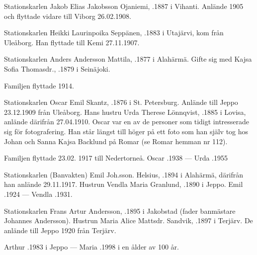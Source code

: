 {Stationskarlen Jakob Elias Jakobsson Ojaniemi, .1887 i Vihanti. Anlände 1905 och flyttade vidare till Viborg 26.02.1908.


Stationskarlen Heikki Laurinpoika Seppänen, .1883 i Utajärvi, kom från Uleåborg. Han flyttade till Kemi 27.11.1907.


Stationskarlen Anders Andersson Mattila, .1877 i Alahärmä. Gifte sig med Kajsa Sofia Thomasdr., .1879 i Seinäjoki.
\begin{jhchildren}
  \item {}
  \item {}
\end{jhchildren}
Familjen flyttade 1914.


Stationskarlen Oscar Emil Skantz, .1876 i St. Petersburg. Anlände till Jeppo 23.12.1909 från Uleåborg. Hans hustru Urda Therese Lönnqvist, .1885 i Lovisa, anlände därifrån 27.04.1910. Oscar var en av de personer som tidigt intresserade sig för fotografering. Han står längst till höger på ett foto som han själv tog hos Johan och Sanna Kajsa Backlund på Romar (se Romar hemman nr 112).
\begin{jhchildren}
  \item {}
  \item {}
  \item {}
\end{jhchildren}
Familjen flyttade 23.02. 1917 till Nedertorneå. Oscar .1938 ---  Urda .1955


Stationskarlen (Banvakten) Emil Joh.sson. Helsius, .1894 i Alahärmä, därifrån han anlände 29.11.1917. Hustrun Vendla Maria Granlund, .1890 i Jeppo.
Emil .1924  ---  Vendla .1931.


Stationskarlen Frans Artur Andersson, .1895 i Jakobstad (fader banmästare Johannes Andersson). Hustrun Maria Alice Mattsdr. Sandvik, .1897 i Terjärv. De anlände till Jeppo 1920 från Terjärv.
\begin{jhchildren}
  \item {}
  \item {}
\end{jhchildren}
Arthur .1983 i Jeppo  ---  Maria .1998 i en ålder av 100 år.


}
